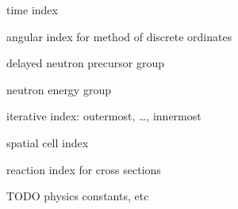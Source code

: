 \documentclass{proposal}
\begin{document}
\begin{appendices}
\begin{description}[labelindent=1cm, labelwidth=1.2cm, before={\renewcommand\makelabel[1]{##1 $=$}}]
    \item[$j$] time index
    \item[$m$] angular index for method of discrete ordinates
    \item[$k$] delayed neutron precursor group
    \item[$g$] neutron energy group  
    \item[$n, s, l, r$] iterative index: outermost, \dots, innermost
    \item[$i$] spatial cell index\
    \item[$u$] reaction index for cross sections
\end{description}


TODO physics constants, etc




    



\end{appendices}
\end{document}
